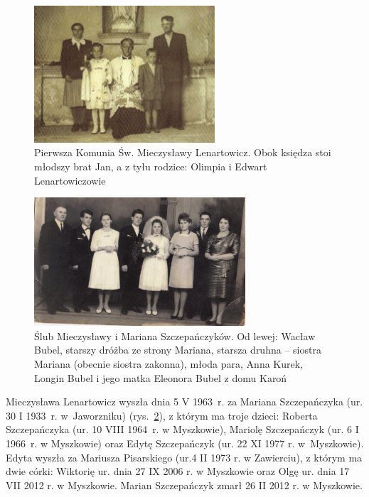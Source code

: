 \begin{figure}[!h]
\begin{center}
\includegraphics[width=0.6\textwidth]{zdjecia/olimpia_edward_lenartowicz_z_dziecmi.jpg}
\caption[Pierwsza Komunia Św. Mieczysławy Lenartowicz, zdjęcie z bratem Janem i rodzicami: Olimpią i Edwardem.]{Pierwsza Komunia Św. Mieczysławy Lenartowicz. Obok księdza stoi młodszy brat Jan, a z tyłu rodzice: Olimpia i Edwart Lenartowiczowie}
\label{rys:olimpia_edward_lenartowicz_z_dziecmi.jpg}
\end{center}
\end{figure}

\begin{figure}[!b]
\begin{center}
\includegraphics[width=0.7\textwidth]{zdjecia/slub_mieczyslawy_i_mariana_szczepanczykow.jpg}
\caption[Ślub Mieczysławy i Mariana Szczepańczyków]{Ślub Mieczysławy i Mariana Szczepańczyków. Od lewej: Wacław Bubel, starszy dróżba ze strony Mariana, starsza druhna -- siostra Mariana (obecnie siostra zakonna), młoda para, Anna Kurek, Longin Bubel i jego matka Eleonora Bubel z domu Karoń}
\label{rys:slub_mieczyslawy_i_mariana_szczepanczykow}
\end{center}
\end{figure}

Mieczysława Lenartowicz wyszła dnia 5 V 1963~r. za Mariana Szczepańczyka (ur. 30 I 1933~r. w~Jaworzniku) (rys.~\ref{rys:slub_mieczyslawy_i_mariana_szczepanczykow}), z którym ma troje dzieci: Roberta Szczepańczyka (ur. 10 VIII 1964~r. w Myszkowie), Mariolę Szczepańczyk (ur. 6 I 1966~r. w Myszkowie) oraz Edytę Szczepańczyk (ur. 22 XI 1977 r. w~Myszkowie). Edyta wyszła za Mariusza Pisarskiego (ur.4 II 1973 r. w Zawierciu), z którym ma dwie córki: Wiktorię ur. dnia 27 IX 2006 r. w Myszkowie oraz Olgę ur. dnia 17 VII 2012 r. w Myszkowie. Marian Szczepańczyk zmarł 26 II 2012 r. w Myszkowie.


